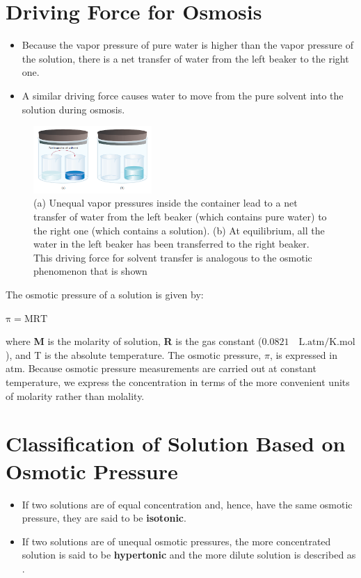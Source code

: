 \documentclass[a4paper,12pt,twocolumn]{article}
\begin{document}
\section{Driving Force for Osmosis}
\begin{itemize}
\item Because the vapor pressure of pure water is higher than the vapor pressure of the solution, there is a net transfer of water from the left beaker to the right one. 
\item A similar driving force causes water to move from the pure solvent into the solution during osmosis.
\end{itemize}
\begin{figure}[h]
\begin{center}
\includegraphics[width=0.4\textwidth]{Screenshot 2023-03-23 155651.png}
\end{center}
\caption{(a) Unequal vapor
pressures inside the container
lead to a net transfer of water
from the left beaker (which
contains pure water) to the right
one (which contains a solution).
(b) At equilibrium, all the water
in the left beaker has been
transferred to the right beaker.
This driving force for solvent
transfer is analogous to the
osmotic phenomenon that is
shown}
\end{figure}
The osmotic pressure of a solution is given by:
\begin{center}
$\mathrm{\pi = MRT}$
\end{center}
where \textbf{M} is the molarity of solution, \textbf{R} is the gas constant ($\mathrm{0.0821 \quad L . atm/K . mol}$), and
T is the absolute temperature. The osmotic pressure, $\pi$, is expressed in atm. Because
osmotic pressure measurements are carried out at constant temperature, we express the
concentration in terms of the more convenient units of molarity rather than molality.\\
\section{Classification of Solution Based on Osmotic Pressure}
\begin{itemize}
\item If two solutions are of equal concentration and, hence, have the same osmotic pressure, they are said to be \textbf{isotonic}. 
\item If two solutions are of unequal osmotic pressures, the more concentrated solution is said to be \textbf{hypertonic} and the more dilute solution is described as .

\end{itemize}
\end{document}

